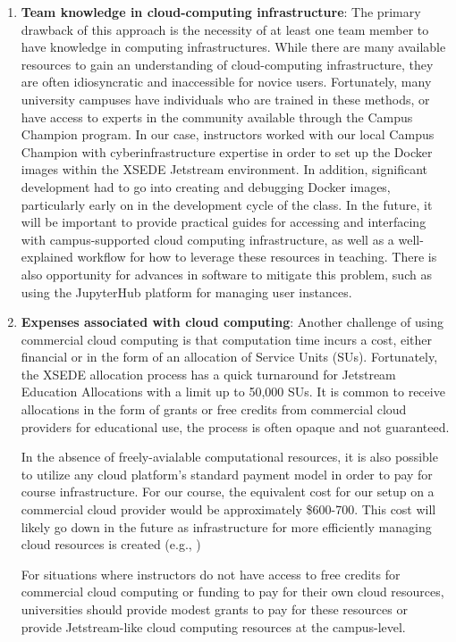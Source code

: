 \begin{enumerate}

\item {\bf Team knowledge in cloud-computing infrastructure}: The primary drawback of
this approach is the necessity of at least one team member to have knowledge
in computing infrastructures. While there are many available resources to gain an
understanding of cloud-computing infrastructure, they are often idiosyncratic and
inaccessible for novice users. Fortunately, many university campuses
have individuals who are trained in these methods, or have access to experts in
the community available through the Campus Champion program. In our case, instructors
worked with our local Campus Champion with cyberinfrastructure expertise in order to set up the Docker images within
the XSEDE Jetstream environment. In addition, significant development had to go
into creating and debugging Docker images, particularly early on in the
development cycle of the class. In the future, it will be important to provide
practical guides for accessing and interfacing with campus-supported cloud computing infrastructure, as
well as a well-explained workflow for how to leverage these resources in
teaching. There is also opportunity for advances in software to mitigate this
problem, such as using the JupyterHub \cite{perez2015project} platform
for managing user instances.

\item {\bf Expenses associated with cloud computing}: Another challenge of using
commercial cloud computing is that computation time incurs a cost, either
financial or in the form of an allocation of Service Units (SUs).
Fortunately, the XSEDE allocation process has a quick
turnaround for Jetstream Education Allocations with a limit up to 50,000 SUs.
It is common to receive allocations in the form of grants or free credits
from commercial cloud providers for educational use, the process is often
opaque and not guaranteed.

In the absence of freely-avialable computational resources, it is also
possible to utilize any cloud platform's standard payment model in order
to pay for course infrastructure. For our course, the equivalent cost
for our setup on a commercial cloud provider would be approximately \$600-700.
This cost will likely go down in the future as infrastructure for more efficiently
managing cloud resources is created (e.g., \cite{perez2015project})

For situations where instructors do not have access to free credits for
commercial cloud computing or funding to pay for their own
cloud resources, universities should provide modest grants to pay for
these resources or provide Jetstream-like cloud computing resources at the
campus-level.


\end{enumerate}

